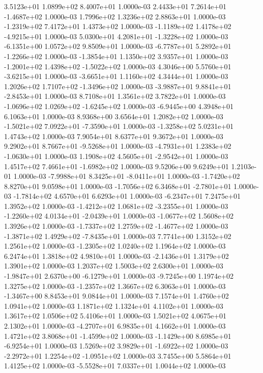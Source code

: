 3.5123e+01 1.0899e+02 8.4007e+01  1.0000e-03
 2.4433e+01  7.2614e+01 -1.4687e+02  1.0000e-03
1.7996e+02 1.3236e+02 2.8863e+01  1.0000e-03
-1.2319e+02  7.4172e+01  1.4373e+02  1.0000e-03
-1.1189e+02  1.4178e+02 -4.9215e+01  1.0000e-03
 5.0300e+01  4.2081e+01 -1.3228e+02  1.0000e-03
-6.1351e+00  1.0572e+02  9.8509e+01  1.0000e-03
-6.7787e+01  5.2892e+01 -1.2266e+02  1.0000e-03
-1.3854e+01  1.1350e+02  3.9357e+01  1.0000e-03
-1.2001e+02  1.4398e+02 -1.5022e+02  1.0000e-03
 4.3046e+00  5.5760e+01 -3.6215e+01  1.0000e-03
-3.6651e+01  1.1160e+02  4.3444e+01  1.0000e-03
 1.2026e+02  1.7107e+02 -1.3496e+02  1.0000e-03
-3.9887e+01  9.8841e+01 -2.8453e+01  1.0000e-03
8.7108e+01 1.3561e+02 3.7822e+01  1.0000e-03
-1.0696e+02  1.0269e+02 -1.6245e+02  1.0000e-03
-6.9445e+00  4.3948e+01  6.1063e+01  1.0000e-03
8.9368e+00 3.6564e+01 1.2082e+02  1.0000e-03
-1.5021e+02  7.0922e+01 -7.3590e+01  1.0000e-03
-1.3258e+02  5.0231e+01  1.4743e+02  1.0000e-03
7.9054e+01 8.6377e+01 9.3672e+01  1.0000e-03
 9.2902e+01  8.7667e+01 -9.5268e+01  1.0000e-03
-4.7931e+01  1.2383e+02 -1.0630e+01  1.0000e-03
 1.1908e+02  4.5605e+01 -2.9542e+01  1.0000e-03
 1.4517e+02  7.4661e+01 -1.6982e+02  1.0000e-03
9.5206e+00 9.6249e+01 1.2103e-01  1.0000e-03
-7.9988e+01  8.3425e+01 -8.0411e+01  1.0000e-03
-1.7420e+02  8.8270e+01  9.0598e+01  1.0000e-03
-1.7056e+02  6.3468e+01 -2.7801e+01  1.0000e-03
-1.7814e+02  4.6570e+01  6.6293e+01  1.0000e-03
-6.2347e+01  7.2475e+01  1.3952e+02  1.0000e-03
-1.4212e+02  1.0681e+02 -3.2355e+01  1.0000e-03
-1.2260e+02  4.0134e+01 -2.0439e+01  1.0000e-03
-1.0677e+02  1.5608e+02  1.3926e+02  1.0000e-03
-1.7337e+02  1.2759e+02 -1.4677e+02  1.0000e-03
-1.3871e+02  1.4929e+02 -7.8435e+01  1.0000e-03
7.7741e+00 1.3152e+02 1.2561e+02  1.0000e-03
-1.2305e+02  1.0240e+02  1.1964e+02  1.0000e-03
6.2474e+01 1.3818e+02 4.9810e+01  1.0000e-03
-2.1436e+01  1.3179e+02  1.3901e+02  1.0000e-03
1.2037e+02 1.5003e+02 2.6300e+01  1.0000e-03
-1.9847e+01  2.6370e+00 -6.1279e+01  1.0000e-03
-9.7245e+00  1.1974e+02  1.3275e+02  1.0000e-03
-1.2357e+02  1.3667e+02  6.3063e+01  1.0000e-03
-1.3467e+00  8.8453e+01  9.0844e+01  1.0000e-03
7.1574e+01 1.4760e+02 1.0941e+02  1.0000e-03
1.1871e+02 1.1324e+01 4.1102e+01  1.0000e-03
1.3617e+02 1.0506e+02 5.4106e+01  1.0000e-03
1.5021e+02 4.0675e+01 2.1302e+01  1.0000e-03
-4.2707e+01  6.9835e+01  4.1662e+01  1.0000e-03
 1.4721e+02  3.8068e+01 -1.4599e+02  1.0000e-03
-1.1429e+00  8.6985e+01 -6.9254e+01  1.0000e-03
 1.5269e+02  3.9829e+01 -1.6922e+02  1.0000e-03
-2.2972e+01  1.2254e+02 -1.0951e+02  1.0000e-03
3.7455e+00 5.5864e+01 1.4125e+02  1.0000e-03
-5.5528e+01  7.0337e+01  1.0044e+02  1.0000e-03
